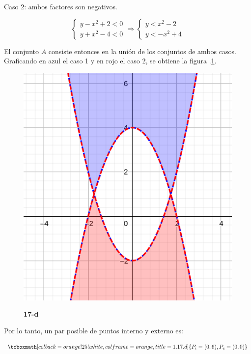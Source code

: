 \documentclass{article}
\begin{document}
Caso 2: ambos factores son negativos.

\begin{equation}
\left\{ \begin{array}{ll}
y - x^2 + 2 < 0 \\
y + x^2 -4 < 0
\end{array}
\right. \Rightarrow \left\{ \begin{array}{ll}
y < x^2 - 2 \\
y < -x^2 + 4
\end{array}
\right.
\end{equation}

El conjunto $A$ consiste entonces en la unión de los conjuntos de ambos casos. Graficando en azul el caso 1 y en rojo el caso 2, se obtiene la figura .\ref{fig:1-17-d}.

\begin{figure}[ht]
\caption{\textbf{17-d}}
\includegraphics[scale=1]{../img/exercises/guide_01/17_d.png} 
\centering
\label{fig:1-17-d}
\end{figure}

Por lo tanto, un par posible de puntos interno y externo es:

\begin{equation}
\tcboxmath[colback=orange!25!white,colframe=orange,title=1.17.d]
{
P_i = (0, 6), P_e = (0, 0)
}
\end{equation}
\end{document}
